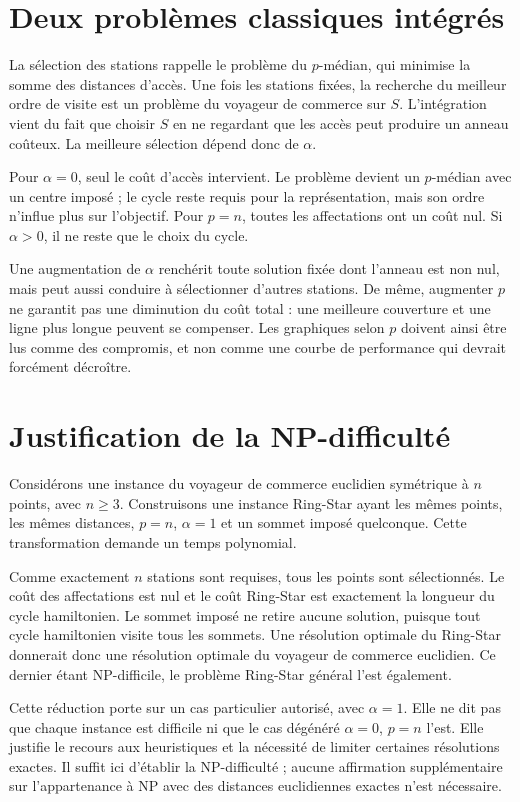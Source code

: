 \section{Deux problèmes classiques intégrés}
La sélection des stations rappelle le problème du $p$-médian, qui minimise la
somme des distances d'accès. Une fois les stations fixées, la recherche du
meilleur ordre de visite est un problème du voyageur de commerce sur $S$.
L'intégration vient du fait que choisir $S$ en ne regardant que les accès peut
produire un anneau coûteux. La meilleure sélection dépend donc de $\alpha$.

Pour $\alpha=0$, seul le coût d'accès intervient. Le problème devient un
$p$-médian avec un centre imposé ; le cycle reste requis pour la représentation,
mais son ordre n'influe plus sur l'objectif. Pour $p=n$, toutes les affectations
ont un coût nul. Si $\alpha>0$, il ne reste que le choix du cycle.

Une augmentation de $\alpha$ renchérit toute solution fixée dont l'anneau est
non nul, mais peut aussi conduire à sélectionner d'autres stations. De même,
augmenter $p$ ne garantit pas une diminution du coût total : une meilleure
couverture et une ligne plus longue peuvent se compenser. Les graphiques selon
$p$ doivent ainsi être lus comme des compromis, et non comme une courbe de
performance qui devrait forcément décroître.

\section{Justification de la NP-difficulté}
Considérons une instance du voyageur de commerce euclidien symétrique à $n$
points, avec $n\geq3$. Construisons une instance Ring-Star ayant les mêmes points,
les mêmes distances, $p=n$, $\alpha=1$ et un sommet imposé quelconque.
Cette transformation demande un temps polynomial.

Comme exactement $n$ stations sont requises, tous les points sont sélectionnés.
Le coût des affectations est nul et le coût Ring-Star est exactement la longueur
du cycle hamiltonien. Le sommet imposé ne retire aucune solution, puisque tout
cycle hamiltonien visite tous les sommets. Une résolution optimale du Ring-Star
donnerait donc une résolution optimale du voyageur de commerce euclidien.
Ce dernier étant NP-difficile, le problème Ring-Star général l'est également.

Cette réduction porte sur un cas particulier autorisé, avec $\alpha=1$.
Elle ne dit pas que chaque instance est difficile ni que le cas dégénéré
$\alpha=0$, $p=n$ l'est. Elle justifie le recours aux heuristiques et la nécessité
de limiter certaines résolutions exactes. Il suffit ici d'établir la
NP-difficulté ; aucune affirmation supplémentaire sur l'appartenance à NP avec
des distances euclidiennes exactes n'est nécessaire.
